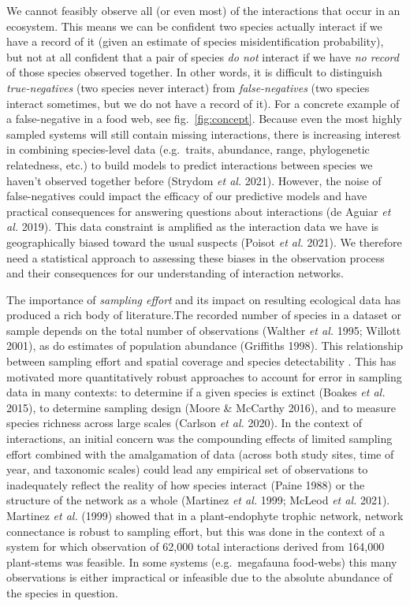 \documentclass[10pt,oneside]{article}
\begin{document}
We cannot feasibly observe all (or even most) of the interactions that
occur in an ecosystem. This means we can be confident two species
actually interact if we have a record of it (given an estimate of
species misidentification probability), but not at all confident that a
pair of species \emph{do not} interact if we have \emph{no record} of
those species observed together. In other words, it is difficult to
distinguish \emph{true-negatives} (two species never interact) from
\emph{false-negatives} (two species interact sometimes, but we do not
have a record of it). For a concrete example of a false-negative in a
food web, see fig.~\ref{fig:concept}. Because even the most highly
sampled systems will still contain missing interactions, there is
increasing interest in combining species-level data (e.g.~traits,
abundance, range, phylogenetic relatedness, etc.) to build models to
predict interactions between species we haven't observed together before
(Strydom \emph{et al.} 2021). However, the noise of false-negatives
could impact the efficacy of our predictive models and have practical
consequences for answering questions about interactions (de Aguiar
\emph{et al.} 2019). This data constraint is amplified as the
interaction data we have is geographically biased toward the usual
suspects (Poisot \emph{et al.} 2021). We therefore need a statistical
approach to assessing these biases in the observation process and their
consequences for our understanding of interaction networks.

The importance of \emph{sampling effort} and its impact on resulting
ecological data has produced a rich body of literature.The recorded
number of species in a dataset or sample depends on the total number of
observations (Walther \emph{et al.} 1995; Willott 2001), as do estimates
of population abundance (Griffiths 1998). This relationship between
sampling effort and spatial coverage and species detectability . This
has motivated more quantitatively robust approaches to account for error
in sampling data in many contexts: to determine if a given species is
extinct (Boakes \emph{et al.} 2015), to determine sampling design (Moore
\& McCarthy 2016), and to measure species richness across large scales
(Carlson \emph{et al.} 2020). In the context of interactions, an initial
concern was the compounding effects of limited sampling effort combined
with the amalgamation of data (across both study sites, time of year,
and taxonomic scales) could lead any empirical set of observations to
inadequately reflect the reality of how species interact (Paine 1988) or
the structure of the network as a whole (Martinez \emph{et al.} 1999;
McLeod \emph{et al.} 2021). Martinez \emph{et al.} (1999) showed that in
a plant-endophyte trophic network, network connectance is robust to
sampling effort, but this was done in the context of a system for which
observation of 62,000 total interactions derived from 164,000
plant-stems was feasible. In some systems (e.g.~megafauna food-webs)
this many observations is either impractical or infeasible due to the
absolute abundance of the species in question.
\end{document}
